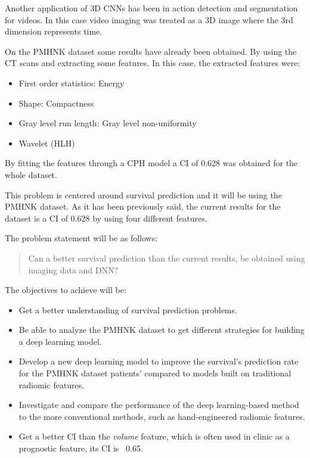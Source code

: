 Another application of 3D \glspl{CNN} has been in action detection and segmentation for videos.
In this case video imaging was treated as a 3D image where the 3rd dimension represents
time.
~\cite{neural:3d-cnn-action-detection}

On the \gls{PMHNK} dataset some results have already been obtained. By using the \gls{CT} scans and
extracting some features. In this case, the extracted features were:
\begin{itemize}
  \item First order statistics: Energy
  \item Shape: Compactness
  \item Gray level run length: Gray level non-uniformity
  \item Wavelet (HLH) 
\end{itemize}
By fitting the features through a \gls{CPH} model a \gls{CI} of 0.628 was obtained for the whole
dataset.
~\cite{medical:ct-based-radiomic-signature}


This problem is centered around survival prediction and it will be using the \gls{PMHNK} dataset. 
As it has been previously said, the current results for the dataset is a \gls{CI}
of 0.628 \cite{medical:ct-based-radiomic-signature} by using four different features.

The problem statement will be as follows:
\begin{quotation}
  Can a better survival prediction than the current results, be obtained using imaging data and
  \gls{DNN}?
\end{quotation}


The objectives to achieve will be:
\begin{itemize}
  \item Get a better understanding of survival prediction problems.
  \item Be able to analyze the \gls{PMHNK} dataset to get different strategies for building a 
  deep learning model.
  \item Develop a new deep learning model to improve the survival's prediction rate for the
  \gls{PMHNK} dataset patients' compared to models built on traditional radiomic features.
  \item Investigate and compare the performance of the deep learning-based method to 
  the more conventional methods, such as hand-engineered radiomic features.
  \item Get a better \gls{CI} than the \emph{volume} feature, which is often used in clinic as a
  prognostic feature, its \gls{CI} is ~0.65.
\end{itemize}

